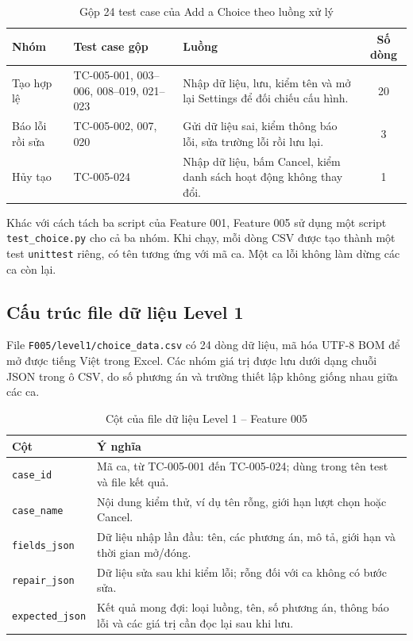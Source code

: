 \documentclass[12pt,a4paper]{article}
\begin{document}
\begin{table}[H]
\centering\small
\begin{tabular}{|L{2.7cm}|L{4.0cm}|L{5.0cm}|c|}
\hline
{}\textbf{Nhóm} & \textbf{Test case gộp} & \textbf{Luồng} & \textbf{Số dòng} \\ \hline
Tạo hợp lệ & TC-005-001, 003--006, 008--019, 021--023 & Nhập dữ liệu, lưu, kiểm tên và mở lại Settings để đối chiếu cấu hình. & 20 \\ \hline
Báo lỗi rồi sửa & TC-005-002, 007, 020 & Gửi dữ liệu sai, kiểm thông báo lỗi, sửa trường lỗi rồi lưu lại. & 3 \\ \hline
Hủy tạo & TC-005-024 & Nhập dữ liệu, bấm Cancel, kiểm danh sách hoạt động không thay đổi. & 1 \\ \hline
\end{tabular}
\caption{Gộp 24 test case của Add a Choice theo luồng xử lý}
\end{table}

Khác với cách tách ba script của Feature 001, Feature 005 sử dụng một script
\texttt{test\_choice.py} cho cả ba nhóm. Khi chạy, mỗi dòng CSV được tạo thành một test
\texttt{unittest} riêng, có tên tương ứng với mã ca. Một ca lỗi không làm dừng các ca còn lại.

\subsection{Cấu trúc file dữ liệu Level 1}
File \texttt{F005/level1/choice\_data.csv} có 24 dòng dữ liệu, mã hóa UTF-8 BOM để mở được tiếng Việt
trong Excel. Các nhóm giá trị được lưu dưới dạng chuỗi JSON trong ô CSV, do số phương án và trường
thiết lập không giống nhau giữa các ca.

\begin{table}[H]
\centering\small
\begin{tabular}{|L{3.6cm}|L{10.5cm}|}
\hline
{}\textbf{Cột} & \textbf{Ý nghĩa} \\ \hline
\texttt{case\_id} & Mã ca, từ TC-005-001 đến TC-005-024; dùng trong tên test và file kết quả. \\ \hline
\texttt{case\_name} & Nội dung kiểm thử, ví dụ tên rỗng, giới hạn lượt chọn hoặc Cancel. \\ \hline
\texttt{fields\_json} & Dữ liệu nhập lần đầu: tên, các phương án, mô tả, giới hạn và thời gian mở/đóng. \\ \hline
\texttt{repair\_json} & Dữ liệu sửa sau khi kiểm lỗi; rỗng đối với ca không có bước sửa. \\ \hline
\texttt{expected\_json} & Kết quả mong đợi: loại luồng, tên, số phương án, thông báo lỗi và các giá trị cần đọc lại sau khi lưu. \\ \hline
\end{tabular}
\caption{Cột của file dữ liệu Level 1 -- Feature 005}
\end{table}
\end{document}
